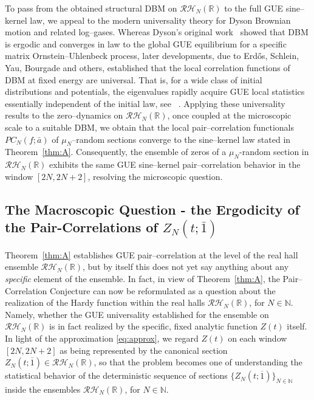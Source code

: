 \documentclass[12pt,reqno]{amsart}
\theoremstyle{plain}
\theoremstyle{definition}
\theoremstyle{remark}
\begin{document}
To pass from the obtained structural DBM on $\mathcal{RH}_N(\mathbb{R})$ to the full GUE sine–kernel law, we appeal to the modern universality theory for Dyson Brownian motion and related log–gases. Whereas Dyson’s original work~\cite{Dyson} showed that DBM is ergodic and converges in law to the global GUE equilibrium for a specific matrix Ornstein–Uhlenbeck process, later developments, due to Erd{\H{o}}s, Schlein, Yau, Bourgade and others, established that the local correlation functions of DBM at fixed energy are universal. That is, for a wide class of initial distributions and potentials, the eigenvalues rapidly acquire GUE local statistics essentially independent of the initial law, see ~\cite{AGZ,BourgadeErdosYau2014,DeiftBook,ErdosSchleinYau2011,ErdosYau2012,ForresterBook,LandonSosoeYau2017,PB}. Applying these universality results to the zero–dynamics on $\mathcal{RH}_N(\mathbb{R})$, once coupled at the microscopic scale to a suitable DBM, we obtain that the local pair–correlation functionals $PC_N(f;\bar a)$ of $\mu_N$–random sections converge to the sine–kernel law stated in Theorem~\ref{thm:A}. Consequently, the ensemble of zeros of a $\mu_N$-random section in $\mathcal{RH}_N(\mathbb{R})$ exhibits the same GUE sine–kernel pair–correlation behavior in the window $[2N,2N+2]$, resolving the microscopic question.




\subsection{The Macroscopic Question - the Ergodicity of the Pair-Correlations of $Z_N(t; \bar 1)$}
Theorem~\ref{thm:A} establishes GUE pair--correlation at the level of the real hall ensemble
\(\mathcal{RH}_N(\mathbb{R})\), but by itself this does not yet say anything about any
\emph{specific} element of the ensemble.
In fact, in view of Theorem~\ref{thm:A}, the Pair--Correlation Conjecture can now be reformulated as a question about the realization of the Hardy function within the real halls \(\mathcal{RH}_N(\mathbb{R})\), for \(N\in\mathbb{N}\). Namely, whether the GUE universality established for the ensemble on \(\mathcal{RH}_N(\mathbb{R})\) is in fact realized by the specific, fixed analytic function \(Z(t)\) itself. In light of the approximation \eqref{eq:approx}, we regard \(Z(t)\) on each window \([2N,2N+2]\) as being represented by the canonical section
$Z_N(t;\overline{1}) \in \mathcal{RH}_N(\mathbb{R})$, so that the problem becomes one of understanding the statistical behavior of the deterministic sequence of sections \(\{Z_N(t;\overline{1})\}_{N\in\mathbb{N}}\) inside the ensembles \(\mathcal{RH}_N(\mathbb{R})\), for $N \in \mathbb{N}$.
\end{document}
